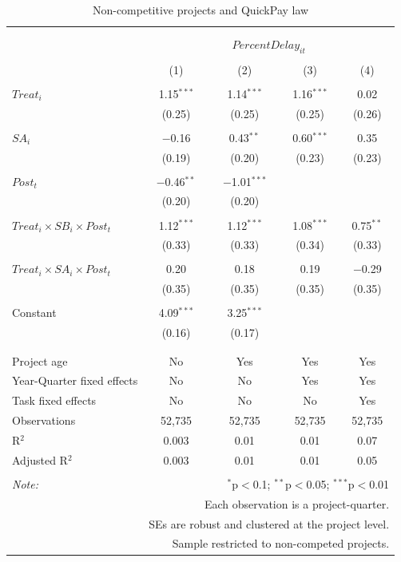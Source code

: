 \documentclass[
]{article}
\begin{document}
\begin{table}[H] \centering 
  \caption{Non-competitive projects and QuickPay law} 
  \label{} 
\small 
\begin{tabular}{@{\extracolsep{-2pt}}lcccc} 
\\[-1.8ex]\hline 
\hline \\[-1.8ex] 
\\[-1.8ex] & \multicolumn{4}{c}{$PercentDelay_{it}$  } \\ 
\\[-1.8ex] & (1) & (2) & (3) & (4)\\ 
\hline \\[-1.8ex] 
 $Treat_i$ & 1.15$^{***}$ & 1.14$^{***}$ & 1.16$^{***}$ & 0.02 \\ 
  & (0.25) & (0.25) & (0.25) & (0.26) \\ 
  & & & & \\ 
 $SA_i$ & $-$0.16 & 0.43$^{**}$ & 0.60$^{***}$ & 0.35 \\ 
  & (0.19) & (0.20) & (0.23) & (0.23) \\ 
  & & & & \\ 
 $Post_t$ & $-$0.46$^{**}$ & $-$1.01$^{***}$ &  &  \\ 
  & (0.20) & (0.20) &  &  \\ 
  & & & & \\ 
 $Treat_i \times SB_i \times Post_t$ & 1.12$^{***}$ & 1.12$^{***}$ & 1.08$^{***}$ & 0.75$^{**}$ \\ 
  & (0.33) & (0.33) & (0.34) & (0.33) \\ 
  & & & & \\ 
 $Treat_i \times SA_i \times Post_t$ & 0.20 & 0.18 & 0.19 & $-$0.29 \\ 
  & (0.35) & (0.35) & (0.35) & (0.35) \\ 
  & & & & \\ 
 Constant & 4.09$^{***}$ & 3.25$^{***}$ &  &  \\ 
  & (0.16) & (0.17) &  &  \\ 
  & & & & \\ 
\hline \\[-1.8ex] 
Project age & No & Yes & Yes & Yes \\ 
Year-Quarter fixed effects & No & No & Yes & Yes \\ 
Task fixed effects & No & No & No & Yes \\ 
Observations & 52,735 & 52,735 & 52,735 & 52,735 \\ 
R$^{2}$ & 0.003 & 0.01 & 0.01 & 0.07 \\ 
Adjusted R$^{2}$ & 0.003 & 0.01 & 0.01 & 0.05 \\ 
\hline 
\hline \\[-1.8ex] 
\textit{Note:}  & \multicolumn{4}{r}{$^{*}$p$<$0.1; $^{**}$p$<$0.05; $^{***}$p$<$0.01} \\ 
 & \multicolumn{4}{r}{Each observation is a project-quarter.} \\ 
 & \multicolumn{4}{r}{SEs are robust and clustered at the project level.} \\ 
 & \multicolumn{4}{r}{Sample restricted to non-competed projects.} \\ 
\end{tabular} 
\end{table}
\end{document}
